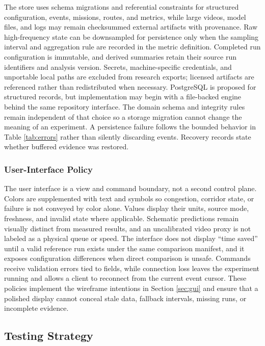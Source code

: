 The store uses schema migrations and referential constraints for structured configuration, events, missions, routes, and metrics, while large videos, model files, and logs may remain checksummed external artifacts with provenance. Raw high-frequency state can be downsampled for persistence only when the sampling interval and aggregation rule are recorded in the metric definition. Completed run configuration is immutable, and derived summaries retain their source run identifiers and analysis version. Secrets, machine-specific credentials, and unportable local paths are excluded from research exports; licensed artifacts are referenced rather than redistributed when necessary. PostgreSQL is proposed for structured records, but implementation may begin with a file-backed engine behind the same repository interface. The domain schema and integrity rules remain independent of that choice so a storage migration cannot change the meaning of an experiment. A persistence failure follows the bounded behavior in Table \ref{tab:errors} rather than silently discarding events. Recovery records state whether buffered evidence was restored.

\subsubsection{User-Interface Policy}

The user interface is a view and command boundary, not a second control plane. Colors are supplemented with text and symbols so congestion, corridor state, or failure is not conveyed by color alone. Values display their units, source mode, freshness, and invalid state where applicable. Schematic predictions remain visually distinct from measured results, and an uncalibrated video proxy is not labeled as a physical queue or speed. The interface does not display ``time saved'' until a valid reference run exists under the same comparison manifest, and it exposes configuration differences when direct comparison is unsafe. Commands receive validation errors tied to fields, while connection loss leaves the experiment running and allows a client to reconnect from the current event cursor. These policies implement the wireframe intentions in Section \ref{sec:gui} and ensure that a polished display cannot conceal stale data, fallback intervals, missing runs, or incomplete evidence.

\subsection{Testing Strategy}

